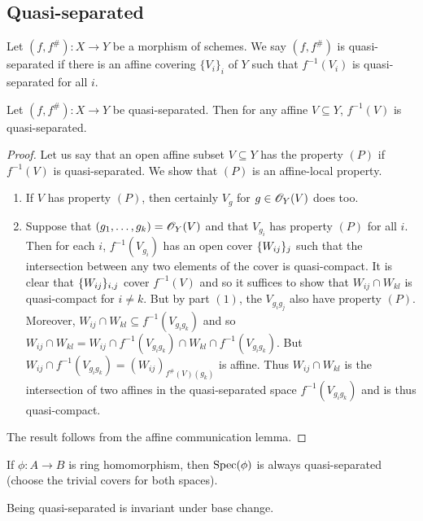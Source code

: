 \documentclass{memoir}
\begin{document}
\subsection{Quasi-separated}
\begin{definition}
    Let $(f,f^\#):X\to Y$ be a morphism of schemes.
    We say $(f,f^\#)$ is quasi-separated if there is an affine covering $\{V_i\}_i$ of $Y$ such that $f^{-1}(V_i)$ is quasi-separated for all $i$.
\end{definition}
\begin{thm}
    Let $(f,f^\#):X\to Y$ be quasi-separated.
    Then for any affine $V\subseteq Y$, $f^{-1}(V)$ is quasi-separated.
\end{thm}
\begin{proof}
    Let us say that an open affine subset $V\subseteq Y$ has the property $(P)$ if $f^{-1}(V)$ is quasi-separated.
    We show that $(P)$ is an affine-local property.
    \begin{enumerate}
        \item If $V$ has property $(P)$, then certainly $V_g$ for $g\in \mathscr{O}_Y(V)$ does too.
        \item Suppose that $(g_1,\dots,g_k) = \mathscr{O}_Y(V)$ and that $V_{g_i}$ has property $(P)$ for all $i$.
            Then for each $i$, $f^{-1}(V_{g_i})$ has an open cover $\lbrace W_{ij}\rbrace_j$ such that the intersection between any two elements of the cover is quasi-compact.
            It is clear that $\lbrace W_{ij}\rbrace_{i,j}$ cover $f^{-1}(V)$ and so it suffices to show that $W_{ij}\cap W_{kl}$ is quasi-compact for $i\ne k$.
            But by part $(1)$, the $V_{g_ig_j}$ also have property $(P)$.
            Moreover, $W_{ij}\cap W_{kl}\subseteq f^{-1}(V_{g_ig_k})$ and so $W_{ij}\cap W_{kl} = W_{ij}\cap f^{-1}(V_{g_ig_k}) \cap W_{kl}\cap f^{-1}(V_{g_ig_k})$.
            But $W_{ij}\cap f^{-1}(V_{g_ig_k}) = (W_{ij})_{f^\#(V)(g_k)}$ is affine.
            Thus $W_{ij}\cap W_{kl}$ is the intersection of two affines in the quasi-separated space $f^{-1}(V_{g_ig_k})$ and is thus quasi-compact.
    \end{enumerate}
    The result follows from the affine communication lemma.
\end{proof}
\begin{remark}
    If $\phi:A\to B$ is ring homomorphism, then $\operatorname{Spec}(\phi)$ is always quasi-separated (choose the trivial covers for both spaces).
\end{remark}
\begin{proposition}
    Being quasi-separated is invariant under base change.
\end{proposition}
\end{document}

